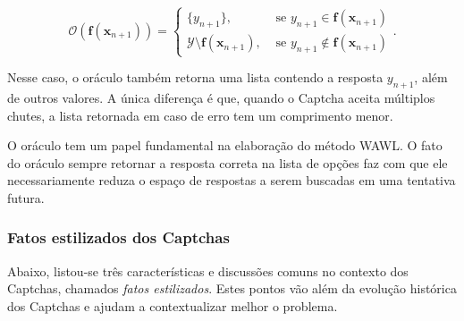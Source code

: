 \documentclass[12pt,twoside,brazilian]{book}
\begin{document}
\[
\mathcal O(\mathbf f(\mathbf x_{n+1})) = \left\{\begin{array}{ll}
    \{y_{n+1}\}, & \text{ se } y_{n+1} \in \mathbf f(\mathbf x_{n+1})  \\
   \mathcal Y \setminus \mathbf f(\mathbf x_{n+1}), & \text{ se } y_{n+1} \notin \mathbf f(\mathbf x_{n+1})
\end{array}\right..
\]

Nesse caso, o oráculo também retorna uma lista contendo a resposta
\(y_{n+1}\), além de outros valores. A única diferença é que, quando o
Captcha aceita múltiplos chutes, a lista retornada em caso de erro tem
um comprimento menor.

O oráculo tem um papel fundamental na elaboração do método WAWL. O fato
do oráculo sempre retornar a resposta correta na lista de opções faz com
que ele necessariamente reduza o espaço de respostas a serem buscadas em
uma tentativa futura.

\hypertarget{fatos-estilizados-dos-captchas}{%
\subsubsection{Fatos estilizados dos
Captchas}\label{fatos-estilizados-dos-captchas}}

Abaixo, listou-se três características e discussões comuns no contexto
dos Captchas, chamados \emph{fatos estilizados}. Estes pontos vão além
da evolução histórica dos Captchas e ajudam a contextualizar melhor o
problema.
\end{document}
